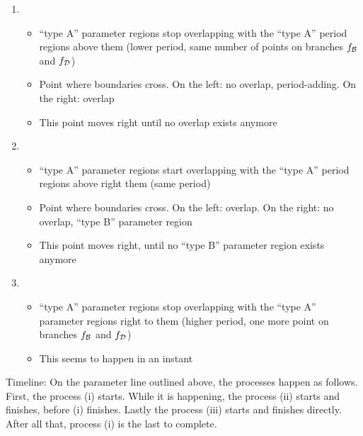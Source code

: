 \begin{enumerate}
    \item \begin{itemize}
              \item ``type A'' parameter regions stop overlapping with the ``type A'' period regions above them (lower period, same number of points on branches $f_{\mathcal{B}}$ and $f_{\mathcal{D}}$)
              \item Point where boundaries cross. On the left: no overlap, period-adding. On the right: overlap
              \item This point moves right until no overlap exists anymore
          \end{itemize}
    \item \begin{itemize}
              \item ``type A'' parameter regions start overlapping with the ``type A'' period regions above right them (same period)
              \item Point where boundaries cross. On the left: overlap. On the right: no overlap, ``type B'' parameter region
              \item This point moves right, until no ``type B'' parameter region exists anymore
          \end{itemize}
    \item \begin{itemize}
              \item ``type A'' parameter regions stop overlapping with the ``type A'' parameter regions right to them (higher period, one more point on branches $f_{\mathcal{B}}$ and $f_{\mathcal{D}}$)
              \item This seems to happen in an instant
          \end{itemize}
\end{enumerate}

Timeline:
On the parameter line outlined above, the processes happen as follows.
First, the process (i) starts.
While it is happening, the process (ii) starts and finishes, before (i) finishes.
Lastly the process (iii) starts and finishes directly.
After all that, process (i) is the last to complete.




